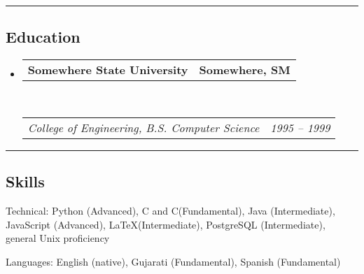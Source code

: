 \documentclass[10pt,letterpaper]{article}
\makeatletter
\newenvironment{indentsection}[1]%
{\begin{list}{}%
	{\setlength{\leftmargin}{#1}}%
	\item[]%
}
{\end{list}}
\newcommand{\headerrow}[2]
{\begin{tabular*}{\linewidth}{l@{\extracolsep{\fill}}r}
	#1 &
	#2 \\
\end{tabular*}}
\newcommand{\CPP}
{C\nolinebreak[4]\hspace{-.05em}\raisebox{.22ex}{\footnotesize\bf ++}}
\makeatother
\begin{document}
\hrule
\vspace{-0.4em}
\subsection*{Education}

\begin{itemize}
	\parskip=0.1em

	\item 
	\headerrow
		{\textbf{Somewhere State University}}
		{\textbf{Somewhere, SM}}
	\\
	\headerrow
		{\emph{College of Engineering, B.S. Computer Science}}
		{\emph{1995 -- 1999}}

\end{itemize}


\hrule
\vspace{-0.4em}
\subsection*{Skills}

\begin{indentsection}{\parindent}
\begin{description*}
	\item[Technical:]
	Python (Advanced), C and \CPP (Fundamental), Java (Intermediate), JavaScript (Advanced), \LaTeX (Intermediate), PostgreSQL (Intermediate), general Unix proficiency
	\item[Languages:]
	English (native), Gujarati (Fundamental), Spanish (Fundamental)
\end{description*}
\end{indentsection}
\end{document}
